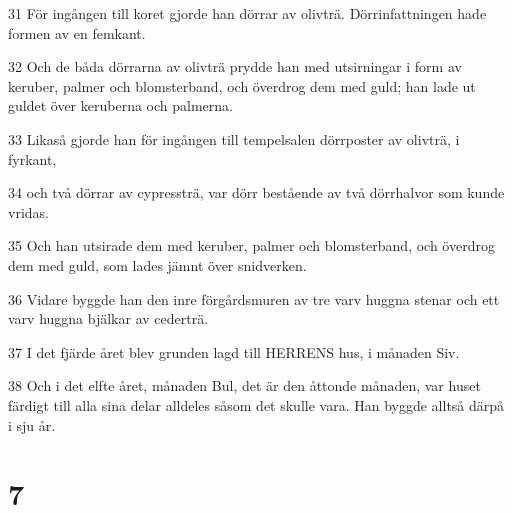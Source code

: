 \par 31 För ingången till koret gjorde han dörrar av olivträ. Dörrinfattningen hade formen av en femkant.
\par 32 Och de båda dörrarna av olivträ prydde han med utsirningar i form av keruber, palmer och blomsterband, och överdrog dem med guld; han lade ut guldet över keruberna och palmerna.
\par 33 Likaså gjorde han för ingången till tempelsalen dörrposter av olivträ, i fyrkant,
\par 34 och två dörrar av cypressträ, var dörr bestående av två dörrhalvor som kunde vridas.
\par 35 Och han utsirade dem med keruber, palmer och blomsterband, och överdrog dem med guld, som lades jämnt över snidverken.
\par 36 Vidare byggde han den inre förgårdsmuren av tre varv huggna stenar och ett varv huggna bjälkar av cederträ.
\par 37 I det fjärde året blev grunden lagd till HERRENS hus, i månaden Siv.
\par 38 Och i det elfte året, månaden Bul, det är den åttonde månaden, var huset färdigt till alla sina delar alldeles såsom det skulle vara. Han byggde alltså därpå i sju år.

\chapter{7}

